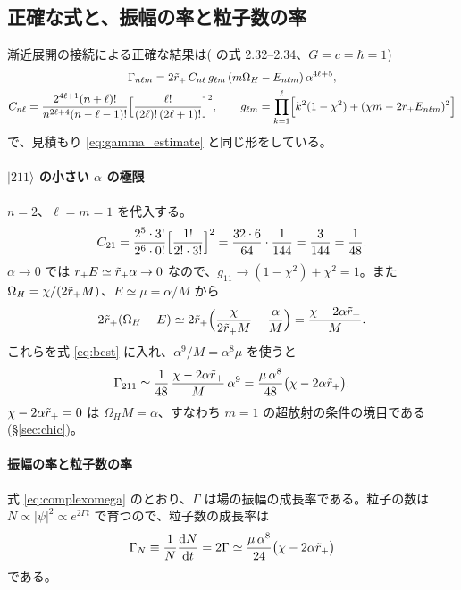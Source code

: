 \subsection{正確な式と、振幅の率と粒子数の率}

漸近展開の接続による正確な結果は( の式 2.32--2.34、$G=c=\hbar=1$)
\begin{gather}
\Gamma_{n\ell m}=2\tilde r_+\,C_{n\ell}\,g_{\ell m}\,(m\Omega_H-E_{n\ell m})\,\alpha^{4\ell+5},
\label{eq:bcst}\\
C_{n\ell}=\frac{2^{4\ell+1}(n+\ell)!}{n^{2\ell+4}(n-\ell-1)!}\Bigl[\frac{\ell!}{(2\ell)!\,(2\ell+1)!}\Bigr]^2,\qquad
g_{\ell m}=\prod_{k=1}^{\ell}\Bigl[k^2(1-\chi^2)+(\chi m-2r_+E_{n\ell m})^2\Bigr]
\notag
\end{gather}
で、見積もり \eqref{eq:gamma_estimate} と同じ形をしている。

\paragraph{$|211\rangle$ の小さい $\alpha$ の極限}
$n=2$、$\ell=m=1$ を代入する。
\begin{equation}
C_{21}=\frac{2^5\cdot3!}{2^6\cdot0!}\Bigl[\frac{1!}{2!\cdot3!}\Bigr]^2=\frac{32\cdot6}{64}\cdot\frac{1}{144}=\frac{3}{144}=\frac{1}{48}.
\end{equation}
$\alpha\to0$ では $r_+E\simeq\tilde r_+\alpha\to0$ なので、$g_{11}\to(1-\chi^2)+\chi^2=1$。また $\Omega_H=\chi/(2\tilde r_+ M)$、$E\simeq\mu=\alpha/M$ から
\begin{equation}
2\tilde r_+(\Omega_H-E)\simeq2\tilde r_+\Bigl(\frac{\chi}{2\tilde r_+ M}-\frac{\alpha}{M}\Bigr)=\frac{\chi-2\alpha\tilde r_+}{M}.
\end{equation}
これらを式 \eqref{eq:bcst} に入れ、$\alpha^9/M=\alpha^8\mu$ を使うと
\begin{equation}
\Gamma_{211}\simeq\frac{1}{48}\,\frac{\chi-2\alpha\tilde r_+}{M}\,\alpha^9=\frac{\mu\,\alpha^8}{48}\bigl(\chi-2\alpha\tilde r_+\bigr).
\label{eq:gamma211}
\end{equation}
$\chi-2\alpha\tilde r_+=0$ は $\Omega_HM=\alpha$、すなわち $m=1$ の超放射の条件の境目である(\S\ref{sec:chic})。

\paragraph{振幅の率と粒子数の率}
式 \eqref{eq:complexomega} のとおり、$\Gamma$ は場の振幅の成長率である。粒子の数は $N\propto|\psi|^2\propto e^{2\Gamma t}$ で育つので、粒子数の成長率は
\begin{equation}
\Gamma_N\equiv\frac{1}{N}\frac{\mathrm{d} N}{\mathrm{d} t}=2\Gamma\simeq\frac{\mu\,\alpha^8}{24}\bigl(\chi-2\alpha\tilde r_+\bigr)
\label{eq:gammaN}
\end{equation}
である。

